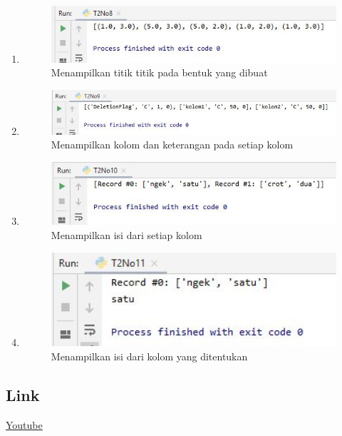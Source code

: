 \begin{enumerate}
	\item 
	
	\begin{figure}[H]
		\includegraphics[width=12cm]{figures/1174042/T2No8.JPG}
		\centering
		\caption{Menampilkan titik titik pada bentuk yang dibuat}
	\end{figure}
	
	\item 
	
	\begin{figure}[H]
		\includegraphics[width=12cm]{figures/1174042/T2No9.JPG}
		\centering
		\caption{Menampilkan kolom dan keterangan pada setiap kolom}
	\end{figure}
	
	\item 
	
	\begin{figure}[H]
		\includegraphics[width=12cm]{figures/1174042/T2No10.JPG}
		\centering
		\caption{Menampilkan isi dari setiap kolom}
	\end{figure}
	
	\item 
	
	\begin{figure}[H]
		\includegraphics[width=12cm]{figures/1174042/T2No11.JPG}
		\centering
		\caption{Menampilkan isi dari kolom yang ditentukan}
	\end{figure}	
\end{enumerate}

\subsection{Link}
\href{https://youtu.be/mozFVwqvabo}{Youtube}